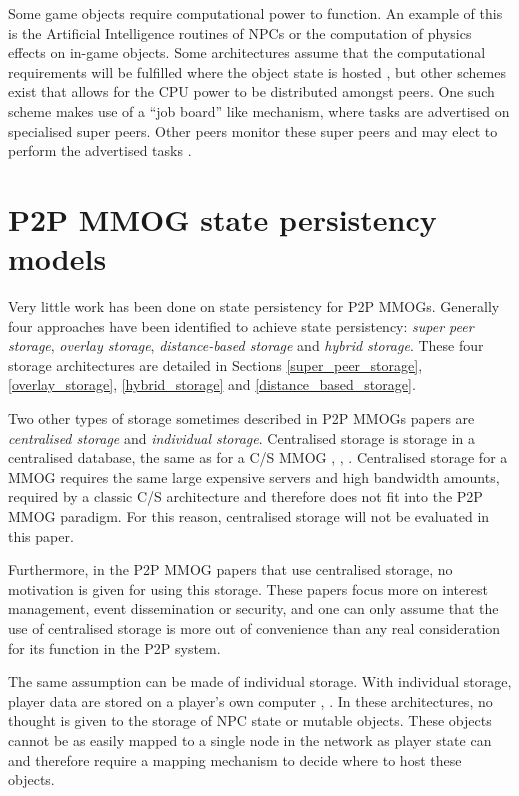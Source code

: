 \documentclass[10pt,a4paper,journal,cspaper,compsoc]{IEEEtran}
\begin{document}
Some game objects require computational power to function. An example of this is the Artificial Intelligence routines of \acp{NPC} or the computation
of physics effects on in-game objects. Some architectures assume that the computational requirements will be fulfilled where the object state is
hosted \cite{solipsis}, but other schemes exist that allows for the CPU power to be distributed amongst peers. One such scheme makes use of a ``job
board'' like mechanism, where tasks are advertised on specialised super peers. Other peers monitor these super peers and may elect to perform the
advertised tasks \cite{fan_mediator_paper}.


\section{P2P MMOG state persistency models}
\label{p2p_mmog_cm_overview}

Very little work has been done on state persistency for P2P MMOGs. Generally four approaches have been identified to achieve state persistency:
\emph{super peer storage}, \emph{overlay storage}, \emph{distance-based storage} and \emph{hybrid storage}. These four storage architectures are
detailed in Sections \ref{super_peer_storage}, \ref{overlay_storage}, \ref{hybrid_storage} and \ref{distance_based_storage}.

Two other types of storage sometimes described in P2P MMOGs papers are \emph{centralised storage} and \emph{individual storage}. Centralised storage
is storage in a centralised database, the same as for a C/S MMOG \cite{badumna_engine}, \cite{rooney_centralised_storage},
\cite{hybrid_p2p_cs_centralised}. Centralised storage for a MMOG requires the same large expensive servers and high bandwidth amounts, required by a
classic C/S architecture and therefore does not fit into the P2P MMOG paradigm. For this reason, centralised storage will not be evaluated in this
paper.

Furthermore, in the P2P MMOG papers that use centralised storage, no motivation is given for using this storage. These papers focus more on interest
management, event dissemination or security, and one can only assume that the use of centralised storage is more out of convenience than any real
consideration for its function in the P2P system.

The same assumption can be made of individual storage. With individual storage, player data are stored on a player's own computer
\cite{individual_storage1}, \cite{cheat_proof_playout}. In these architectures, no thought is given to the storage of NPC state or mutable objects.
These objects cannot be as easily mapped to a single node in the network as player state can and therefore require a mapping mechanism to decide
where to host these objects.
\end{document}
